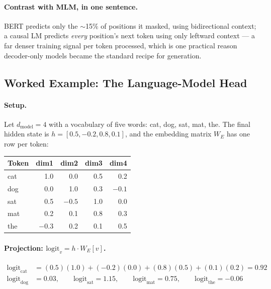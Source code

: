 \documentclass[11pt,a4paper]{article}
\begin{document}
\paragraph{Contrast with MLM, in one sentence.} BERT predicts only the $\sim$15\% of positions
it masked, using bidirectional context; a causal LM predicts \emph{every} position's next
token using only leftward context --- a far denser training signal per token processed, which
is one practical reason decoder-only models became the standard recipe for generation.

\subsection{Worked Example: The Language-Model Head}

\paragraph{Setup.} Let $d_{\text{model}} = 4$ with a vocabulary of five words: cat, dog, sat,
mat, the. The final hidden state is $h = [0.5, -0.2, 0.8, 0.1]$, and the embedding matrix
$W_E$ has one row per token:
\begin{center}
\begin{tabular}{lrrrr}
\textbf{Token} & \textbf{dim1} & \textbf{dim2} & \textbf{dim3} & \textbf{dim4} \\
\hline
cat & 1.0 & 0.0 & 0.5 & 0.2 \\
dog & 0.0 & 1.0 & 0.3 & $-0.1$ \\
sat & 0.5 & $-0.5$ & 1.0 & 0.0 \\
mat & 0.2 & 0.1 & 0.8 & 0.3 \\
the & $-0.3$ & 0.2 & 0.1 & 0.5 \\
\end{tabular}
\end{center}

\paragraph{Projection: $\mathrm{logit}_v = h \cdot W_E[v]$.}
\begin{align*}
\mathrm{logit}_{\text{cat}} &= (0.5)(1.0) + (-0.2)(0.0) + (0.8)(0.5) + (0.1)(0.2) = 0.92 \\
\mathrm{logit}_{\text{dog}} &= 0.03, \qquad
\mathrm{logit}_{\text{sat}} = 1.15, \qquad
\mathrm{logit}_{\text{mat}} = 0.75, \qquad
\mathrm{logit}_{\text{the}} = -0.06
\end{align*}
\end{document}
